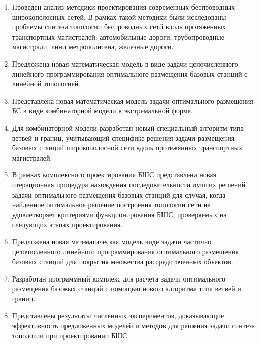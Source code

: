 
\begin{enumerate}
    \item Проведен анализ методики проектирования современных беспроводных широкополосных сетей. В рамках такой методики были исследованы проблемы синтеза топологии беспроводных сетй вдоль протяженных транспортных магистралей: автомобильные дороги, трубопроводные магистрали, лини метрополитена, железные дороги. 
    \item Предложена новая математическая модель в виде задачи целочисленного линейного программирования оптимального размещения базовых станций с линейной топологией.
    \item Представлена новая математическая модель задачи оптимального размещения БС в виде комбинаторной модели в экстремальной форме. 
    \item Для комбинаторной модели разработан новый специальный алгоритм типа ветвей и границ, учитывающий специфике решения задачи размещения базовых станций широкополосной сети вдоль протежянных транспортных магистралей.  
    
    \item В рамках комплексного проектирования БШС представлена новая итерационная процедура нахождения последовательности лучших решений задачи оптимального размещения базовых станций для случая, когда найденное оптимальное решение построения топологии сети не удовлетворяет  критериями функционирования БШС, проверяемых на следующих этапах проектирования.
    \item Предложена новая математическая модель виде задачи частично целочисленного линейного программирования оптимального размещения базовых станций для покрытия множества рассредоточенных объектов. 
    \item Разработан программный комплекс для расчета задачи оптимального размещения базовых станций с помощью нового алгоритма типа ветвей и границ.
    \item Представлены результаты численных экспериментов, доказывающие эффективность предложенных моделей и методов для решения задачи синтеза топологии при проектировании БШС.
\end{enumerate}


